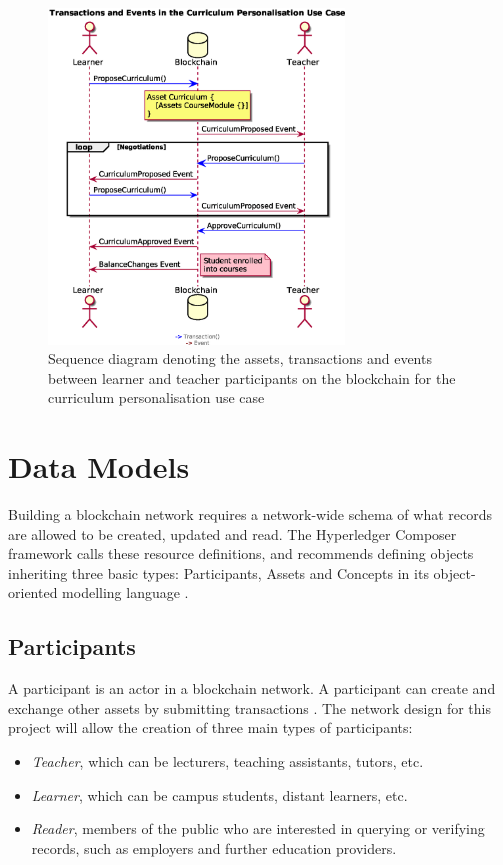 \begin{figure}[!ht] 
    \centering    
    \includegraphics[width=0.7\textwidth]{personalisationloop}
    \caption[Curriculum Personalisation Use Case]
        {Sequence diagram denoting the assets, transactions and events between 
         learner and teacher participants on the blockchain for the curriculum personalisation use case} 
    \label{fig:personalisationloop}
\end{figure}



\section{Data Models}

Building a blockchain network requires a network-wide schema of what records are allowed to be created, updated and read. 
The Hyperledger Composer framework calls these resource definitions, and recommends defining objects 
inheriting three basic types: Participants, Assets and Concepts in its object-oriented modelling language 
\citep{official2018composer}.

\subsection{Participants}

A participant is an actor in a blockchain network. A participant can create and exchange other assets 
by submitting transactions \citep{official2018composer}.
The network design for this project will allow the creation of three main types of participants: 
\begin{itemize}
    \setlength\itemsep{0em}    
    \item \textit{Teacher}, which can be lecturers, teaching assistants, tutors, etc.
    \item \textit{Learner}, which can be campus students, distant learners, etc.
    \item \textit{Reader}, members of the public who are interested in querying or verifying records, 
    such as employers and further education providers.
\end{itemize}

